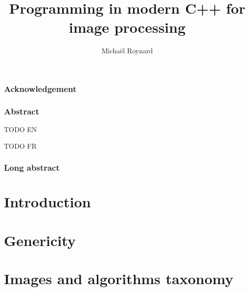 \documentclass[11pt]{book}
\begin{document}
%
\title{Programming in modern C++ for image processing}


\author{Michaël Roynard}



\maketitle

\section{Acknowledgement}
\label{sec.acknowledgement}


\section{Abstract}
\label{sec.abstract}
TODO EN

TODO FR

\section{Long abstract}
\label{sec.long_abstract}


\tableofcontents
\label{table.of.contents}

\listoffigures
\label{list.of.figures}

\listoftables
\label{list.of.tables}

\cleardoublepage


\part{Introduction}
\label{part.introduction}



\cleardoublepage


\part{Genericity}
\label{part.genericity}



\cleardoublepage


\part{Images and algorithms taxonomy}
\label{part.image_and_algorithms_taxonomy}
\end{document}
